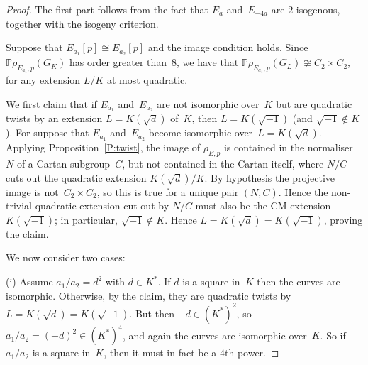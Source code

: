 \documentclass[12pt]{amsart}
\newcommand{\PP}{\mathbb{P}}
\newcommand{\rhobar}{{\overline{\rho}}}
\numberwithin{equation}{section}
\theoremstyle{definition}
\theoremstyle{remark}
\begin{document}
\begin{proof}
The first part follows from the fact that $E_a$ and~$E_{-4a}$ are
$2$-isogenous, together with the isogeny criterion.

Suppose that $E_{a_1}[p]\cong E_{a_2}[p]$ and the image condition
holds.  Since $\PP \rhobar_{E_{a_1},p}(G_K)$ has order greater than~$8$,
we have that $\PP \rhobar_{E_{a_1},p}(G_L)\not\cong C_2\times C_2$, for any extension $L/K$ at most quadratic.

We first claim that if $E_{a_1}$ and~$E_{a_2}$ are not isomorphic
over~$K$ but are quadratic twists by an extension $L=K(\sqrt{d})$
of~$K$, then $L=K(\sqrt{-1})$ (and $\sqrt{-1} \notin K$).  For suppose
that $E_{a_1}$ and~$E_{a_2}$ become isomorphic over~$L=K(\sqrt{d})$.
Applying Proposition~\ref{P:twist}, the image of $\rhobar_{E,p}$ is
contained in the normaliser~$N$ of a Cartan subgroup~$C$, but not
contained in the Cartan itself, where $N/C$ cuts out the quadratic
extension $K(\sqrt{d})/K$.  By hypothesis the projective image is
not~$C_2\times C_2$, so this is true for a unique pair $(N,C)$.  Hence
the non-trivial quadratic extension cut out by $N/C$ must also be the
CM extension $K(\sqrt{-1})$; in particular, $\sqrt{-1} \not\in K$.
Hence $L = K(\sqrt{d})=K(\sqrt{-1})$,
proving the claim.


We now consider two cases:

(i) Assume $a_1/a_2 = d^2$ with $d\in K^*$. If $d$ is a square in~$K$
then the curves are isomorphic.  Otherwise, by the claim, they are
quadratic twists by~$L=K(\sqrt{d})=K(\sqrt{-1})$.  But then
$-d\in(K^*)^2$, so $a_1/a_2=(-d)^2\in(K^*)^4$, and again the curves
are isomorphic over~$K$.  So if $a_1/a_2$ is a square in~$K$, then it must in
fact be a $4$th power.


\end{proof}
\end{document}
